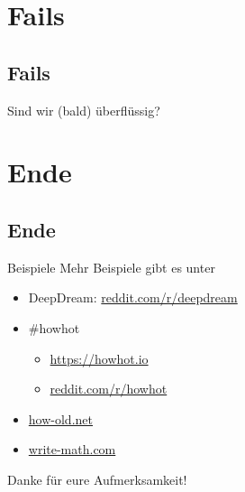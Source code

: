 \section{Fails}
\subsection{Fails}
\begin{frame}{}
    \begin{center}
        \Huge Sind wir (bald) überflüssig?
    \end{center}
\end{frame}


\section{Ende}
\subsection{Ende}
\begin{frame}{Beispiele}
    Mehr Beispiele gibt es unter

    \begin{itemize}
        \item DeepDream: \href{https://www.reddit.com/r/deepdream/}{reddit.com/r/deepdream}
        \item \#howhot
        \begin{itemize}
            \item \href{https://howhot.io/}{https://howhot.io}
            \item \href{https://www.reddit.com/r/howhot/}{reddit.com/r/howhot}
        \end{itemize}
        \item \href{http://how-old.net/}{how-old.net}
        \item \href{http://write-math.com}{write-math.com}
    \end{itemize}

    \begin{center}
        \Huge Danke für eure Aufmerksamkeit!
    \end{center}
\end{frame}

